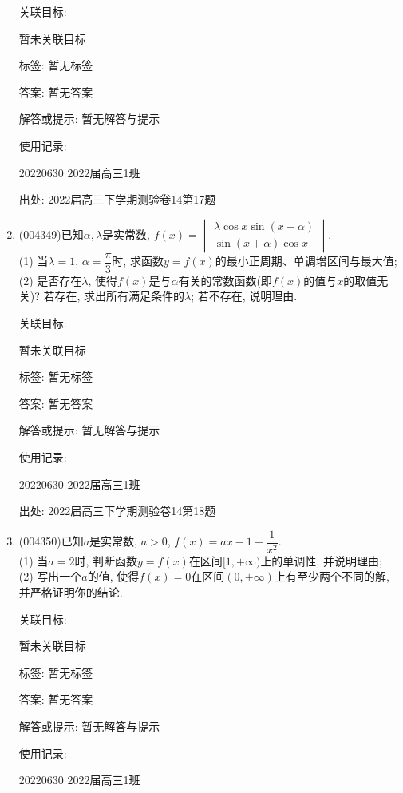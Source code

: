 \documentclass[10pt,a4paper]{article}
\begin{document}
\begin{enumerate}[1.]
关联目标:

暂未关联目标



标签: 暂无标签

答案: 暂无答案

解答或提示: 暂无解答与提示

使用记录:

20220630	2022届高三1班		


出处: 2022届高三下学期测验卷14第17题
\item { (004349)}已知$\alpha,\lambda$是实常数, $f(x)=\begin{vmatrix}
    \lambda \cos x  \sin (x-\alpha)  \\\sin (x+\alpha)  \cos x  \end{vmatrix}$.\\
(1) 当$\lambda=1$, $\alpha=\dfrac{\pi}3$时, 求函数$y=f(x)$的最小正周期、单调增区间与最大值;\\
(2) 是否存在$\lambda$, 使得$f(x)$是与$\alpha$有关的常数函数(即$f(x)$的值与$x$的取值无关)? 若存在, 求出所有满足条件的$\lambda$; 若不存在, 说明理由.


关联目标:

暂未关联目标



标签: 暂无标签

答案: 暂无答案

解答或提示: 暂无解答与提示

使用记录:

20220630	2022届高三1班		


出处: 2022届高三下学期测验卷14第18题
\item { (004350)}已知$a$是实常数, $a>0$, $f(x)=ax-1+\dfrac 1{x^2}$.\\
(1) 当$a=2$时, 判断函数$y=f(x)$在区间$[1,+\infty)$上的单调性, 并说明理由;\\
(2) 写出一个$a$的值, 使得$f(x)=0$在区间$(0,+\infty)$上有至少两个不同的解, 并严格证明你的结论.


关联目标:

暂未关联目标



标签: 暂无标签

答案: 暂无答案

解答或提示: 暂无解答与提示

使用记录:

20220630	2022届高三1班		



\end{enumerate}
\end{document}
